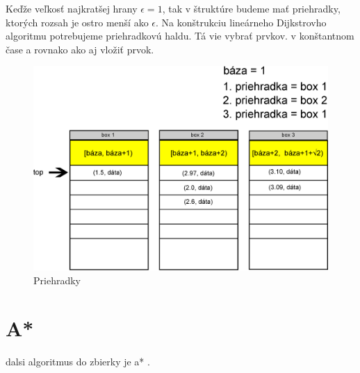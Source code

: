 Keďže veľkosť najkratšej hrany $\epsilon = 1$, tak v štruktúre budeme mať priehradky, ktorých rozsah je ostro menší ako $\epsilon$.
Na konštrukciu lineárneho Dijkstrovho algoritmu potrebujeme priehradkovú haldu. Tá vie vybrať   prvkov.
v konštantnom čase a rovnako ako aj vložiť prvok.

\begin{figure}[h]
\includegraphics[width=\textwidth]{./img/priehradky_naplnene_default.eps}
\caption{Priehradky}
\label{fig:priehradky}
\end{figure}



\section{A*}
dalsi algoritmus do zbierky je a* \cite{astar72}.
